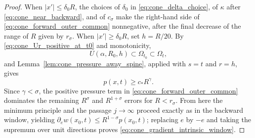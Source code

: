 \documentclass[10pt,a4paper]{amsart}
\begin{document}
\begin{proof}
When \(|x'|\leq\delta_0R\), the choices of \(\delta_0\) in
\eqref{eq:cone_delta_choice}, of \(\kappa\) after
\eqref{eq:cone_near_backward}, and of \(c_\sigma\)  make the right-hand side of
\eqref{eq:cone_forward_outer_common} nonnegative, after the final decrease of the range of $R$ given by 
\(r_\sigma\). When \(|x'|\geq\delta_0R\), set \(h=R/20\). By
\eqref{eq:cone_Ur_positive_at_t0} and monotonicity,
\[
    U(\alpha,R_0,h)\subset\Omega_{t_0}\subset\Omega_t,
\]
and Lemma~\ref{lem:cone_pressure_away_spine}, applied with \(s=t\) and \(r=h\),
gives
\[
    p(x,t)\geq c_*R^\gamma.
\]
Since \(\gamma<\sigma\), the positive pressure term in
\eqref{eq:cone_forward_outer_common} dominates the remaining \(R^\sigma\) and
\(R^{1+\sigma}\) errors for \(R<r_\sigma\). From here the minimum
principle and the passage \(j\to\infty\) proceed exactly as in the backward
window, yielding \(\partial_e w(x_0,t)\leq R^{1-\sigma}p(x_0,t)\); replacing \(e\)
by \(-e\) and taking the supremum over unit directions proves
\eqref{eq:cone_gradient_intrinsic_window}.
\end{proof}
\end{document}
